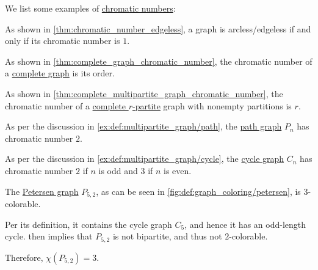 \begin{example}\label{ex:def:graph_chromatic_number}
  We list some examples of \hyperref[def:graph_chromatic_number]{chromatic numbers}:
  \begin{thmenum}
     As shown in \cref{thm:chromatic_number_edgeless}, a graph is arcless/edgeless if and only if its chromatic number is \( 1 \).

     As shown in \cref{thm:complete_graph_chromatic_number}, the chromatic number of a \hyperref[def:complete_graph]{complete graph} is its order.

     As shown in \cref{thm:complete_multipartite_graph_chromatic_number}, the chromatic number of a \hyperref[def:complete_multipartite_graph]{complete \( r \)-partite} graph with nonempty partitions is \( r \).

     As per the discussion in \cref{ex:def:multipartite_graph/path}, the \hyperref[def:path_graph]{path graph} \( P_n \) has chromatic number \( 2 \).

     As per the discussion in \cref{ex:def:multipartite_graph/cycle}, the \hyperref[def:cycle_graph]{cycle graph} \( C_n \) has chromatic number \( 2 \) if \( n \) is odd and \( 3 \) if \( n \) is even.

     The \hyperref[def:petersen_graph]{Petersen graph} \( P_{5,2} \), as can be seen in \cref{fig:def:graph_coloring/petersen}, is \( 3 \)-colorable.

    Per its definition, it contains the cycle graph \( C_5 \), and hence it has an odd-length cycle.  then implies that \( P_{5,2} \) is not bipartite, and thus not \( 2 \)-colorable.

    Therefore, \( \chi(P_{5,2}) = 3 \).
  \end{thmenum}
\end{example}

